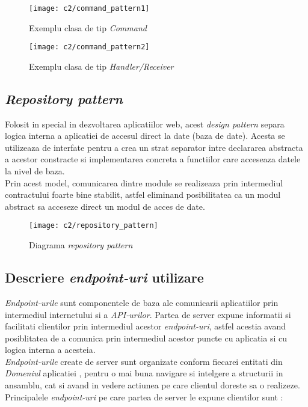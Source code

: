 \vspace{1cm}
\begin{figure}[h]
	\centering
	
	\texttt{[image: c2/command\_pattern1]}
	\caption{Exemplu clasa de tip \textit{Command}}
\end{figure}



\vspace{1cm}
\begin{figure}[h]
	\centering
	
	\texttt{[image: c2/command\_pattern2]}
	\caption{Exemplu clasa de tip \textit{Handler/Receiver}}
\end{figure}


\subsection*{\textit{Repository pattern}}

Folosit in special in dezvoltarea aplicatiilor web, acest \textit{design pattern} separa logica interna a aplicatiei de accesul direct la date (baza de date). Acesta se utilizeaza de interfate pentru a crea un strat separator intre declararea abstracta a acestor constracte si implementarea concreta a functiilor care acceseaza datele la nivel de baza.\\
Prin acest model, comunicarea dintre module se realizeaza prin intermediul contractului foarte bine stabilit, astfel eliminand posibilitatea ca un modul abstract sa acceseze direct un modul de acces de date.\\


\vspace{1cm}
\begin{figure}[h]
	\centering
	
	\texttt{[image: c2/repository\_pattern]}
	\caption{Diagrama \textit{repository pattern}}
\end{figure}
\subsection*{Descriere \textit{endpoint-uri} utilizare}
\textit{Endpoint-urile} sunt componentele de baza ale comunicarii aplicatiilor prin intermediul internetului si a \textit{API-urilor}. Partea de server expune informatii si facilitati clientilor prin intermediul acestor \textit{endpoint-uri}, astfel acestia avand posiblitatea de a comunica prin intermediul acestor puncte cu aplicatia si cu logica interna a acesteia.\\
\textit{Endpoint-urile} create de server sunt organizate conform fiecarei entitati din \textit{Domeniul} aplicatiei , pentru o mai buna navigare si intelgere a structurii in ansamblu, cat si avand in vedere actiunea pe care clientul doreste sa o realizeze.\\
Principalele \textit{endpoint-uri} pe care partea de server le expune clientilor sunt :

